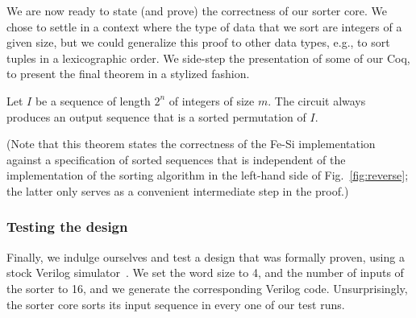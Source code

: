 \documentclass{llncs}
\begin{document}
We are now ready to state (and prove) the correctness of our sorter
core. We chose to settle in a context where the type of data that we
sort are integers of a given size, but we could generalize this proof
to other data types, e.g., to sort tuples in a lexicographic order.
We side-step the presentation of some of our Coq, to present the final
theorem in a stylized fashion.
\begin{theorem}
Let $I$ be a sequence of length $2^n$ of integers of size $m$. The
circuit always produces an output sequence that is a sorted permutation of $I$.
\end{theorem}
(Note that this theorem states the correctness of the Fe-Si
implementation against a specification of sorted sequences that is
independent of the implementation of the sorting algorithm in the
left-hand side of Fig.~\ref{fig:reverse}; the latter only serves as a
convenient intermediate step in the proof.)



\subsubsection{Testing the design}
Finally, we indulge ourselves and test a design that was formally
proven, using a stock Verilog simulator~\cite{iverilog}. We set the
word size to 4, and the number of inputs of the sorter to 16, and we
generate the corresponding Verilog code. Unsurprisingly, the sorter
core sorts its input sequence in every one of our test runs.
\end{document}
